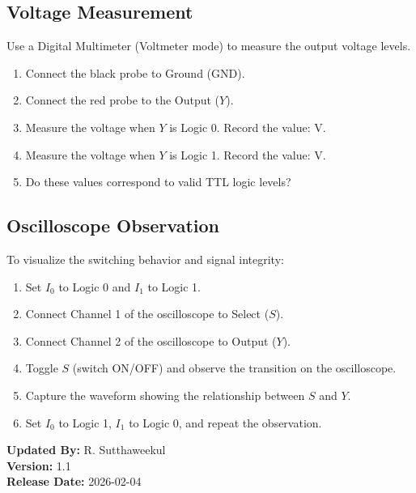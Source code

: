 \documentclass{article}
\begin{document}
\subsection*{Voltage Measurement}
Use a Digital Multimeter (Voltmeter mode) to measure the output voltage levels.
\begin{enumerate}
    \item Connect the black probe to Ground (GND).
    \item Connect the red probe to the Output ($Y$).
    \item Measure the voltage when $Y$ is Logic 0. Record the value: \underline{\hspace{2cm}} V.
    \item Measure the voltage when $Y$ is Logic 1. Record the value: \underline{\hspace{2cm}} V.
    \item Do these values correspond to valid TTL logic levels?
\end{enumerate}

\subsection*{Oscilloscope Observation}
To visualize the switching behavior and signal integrity:
\begin{enumerate}
    \item Set $I_0$ to Logic 0 and $I_1$ to Logic 1.
    \item Connect Channel 1 of the oscilloscope to Select ($S$).
    \item Connect Channel 2 of the oscilloscope to Output ($Y$).
    \item Toggle $S$ (switch ON/OFF) and observe the transition on the oscilloscope.
    \item Capture the waveform showing the relationship between $S$ and $Y$.
    \item Set $I_0$ to Logic 1, $I_1$ to Logic 0, and repeat the observation.
\end{enumerate}



\vspace{2cm}
\noindent \textbf{Updated By:} R. Sutthaweekul \\
\textbf{Version:} 1.1 \\
\textbf{Release Date:} 2026-02-04
\end{document}
